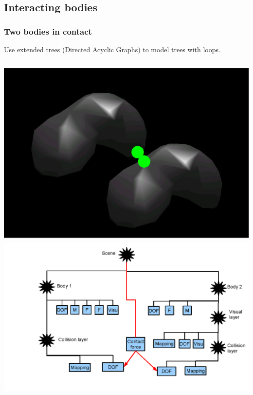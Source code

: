 \documentclass[a4paper,compress]{beamer}
\begin{document}
\subsection{Interacting bodies}

\begin{frame}
\frametitle{Two bodies in contact}
Use extended trees (Directed Acyclic Graphs) to model trees with loops.
\begin{columns}
\includegraphics[width=\linewidth]{livers-contact.png}
\includegraphics[width=\linewidth]{livers-contact-tree.png}
\end{columns}
\end{frame}
\end{document}
